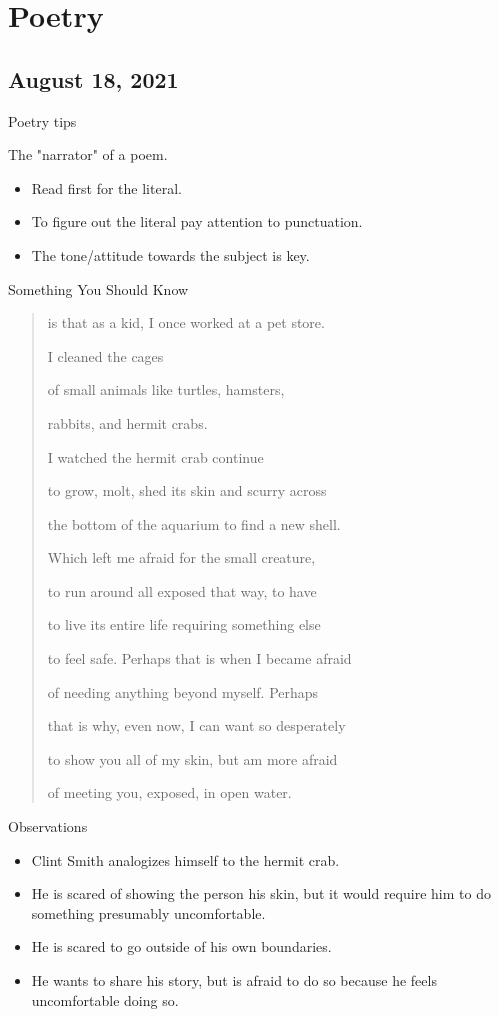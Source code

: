 \documentclass{scrreprt} %
\begin{document}
\section{Poetry}

\subsection{August 18, 2021}

Poetry tips

\begin{definition}[Speaker]
	The "narrator" of a poem.
\end{definition}

\begin{itemize}
	\item Read first for the literal.
	\item To figure out the literal pay attention to punctuation.
	\item The tone/attitude
	towards the subject is key.
\end{itemize}
\begin{example}

Something You Should Know

\begin{quote}
	is that as a kid, I once worked at a pet store.
	
	I cleaned the cages
	
	of small animals like turtles, hamsters,
	
	rabbits, and hermit crabs. 
	
	I watched the hermit crab continue
	
	to grow, molt, shed its skin and scurry across
	
	the bottom of the aquarium to find a new shell.
	
	Which left me afraid for the small creature,
	
	to run around all exposed that way, to have
	
	to live its entire life requiring something else
	
	to feel safe. Perhaps that is when I became afraid
	
	of needing anything beyond myself. Perhaps
	
	that is why, even now, I can want so desperately
	
	to show you all of my skin, but am more afraid
	
	of meeting you, exposed, in open water.
\end{quote}

Observations

\begin{itemize}
	\item Clint Smith analogizes himself to the hermit crab.
	\item He is scared of showing the person his skin, but it would require him
	to do something presumably uncomfortable.
	\item He is scared to go outside of his own boundaries.
	\item He wants to share his story, but is afraid to do so because he feels
	uncomfortable doing so.
\end{itemize}
\end{example}
\end{document}

